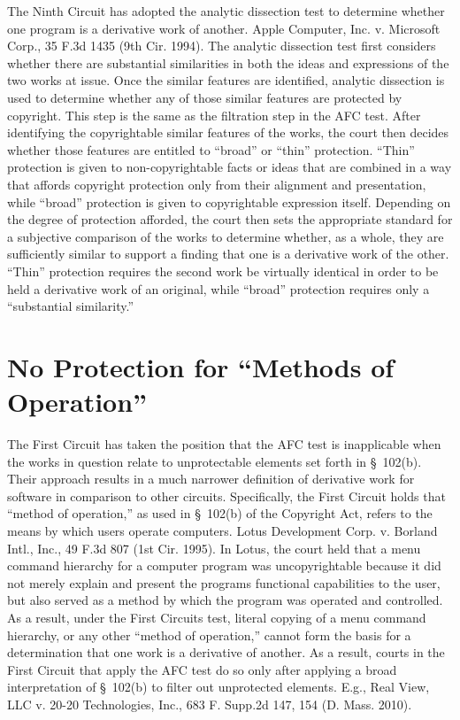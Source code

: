 The Ninth Circuit has adopted the analytic dissection test to determine
whether one program is a derivative work of another. Apple Computer,
Inc. v. Microsoft Corp., 35 F.3d 1435 (9th Cir. 1994). The analytic
dissection test first considers whether there are substantial similarities
in both the ideas and expressions of the two works at issue. Once the
similar features are identified, analytic dissection is used to determine
whether any of those similar features are protected by copyright. This
step is the same as the filtration step in the AFC test. After identifying
the copyrightable similar features of the works, the court then decides
whether those features are entitled to ``broad'' or ``thin''
protection. ``Thin'' protection is given to non-copyrightable facts or
ideas that are combined in a way that affords copyright protection only
from their alignment and presentation, while ``broad'' protection is given
to copyrightable expression itself. Depending on the degree of protection
afforded, the court then sets the appropriate standard for a subjective
comparison of the works to determine whether, as a whole, they are
sufficiently similar to support a finding that one is a derivative work of
the other. ``Thin'' protection requires the second work be virtually
identical in order to be held a derivative work of an original, while
``broad'' protection requires only a ``substantial similarity.''

\section{No Protection for ``Methods of Operation''}

The First Circuit has taken the position that the AFC test is inapplicable 
when the works in question relate to unprotectable elements set forth in 
\S~102(b).  Their approach results in a much narrower definition
of derivative work for software in comparison to other circuits. Specifically, 
the
First Circuit holds that ``method of operation,'' as used in \S~102(b) of
the Copyright Act, refers to the means by which users operate
computers. Lotus Development Corp. v. Borland Intl., Inc., 49 F.3d 807
(1st Cir. 1995).  In Lotus, the court held that a menu command
hierarchy for a computer program was uncopyrightable because it did not
merely explain and present the programs functional capabilities to the
user, but also served as a method by which the program was operated and
controlled. As a result, under the First Circuits test, literal copying
of a menu command hierarchy, or any other ``method of operation,'' cannot
form the basis for a determination that one work is a derivative of
another.  As a result, courts in the First Circuit that apply the AFC test
do so only after applying a broad interpretation of \S~102(b) to filter out
unprotected elements. E.g., Real View, LLC v. 20-20 Technologies, Inc., 
683 F. Supp.2d 147, 154 (D. Mass. 2010).


